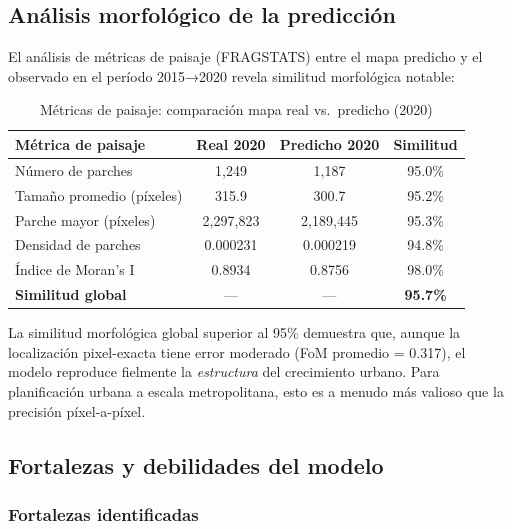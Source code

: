 \subsection{Análisis morfológico de la predicción}

El análisis de métricas de paisaje (FRAGSTATS) entre el mapa predicho y el observado en el período 2015→2020 revela similitud morfológica notable:

\begin{table}[htbp]
\centering
\caption{Métricas de paisaje: comparación mapa real vs.\ predicho (2020)}
\label{tab:landscape_metrics_results}
\begin{tabular}{lccc}
\toprule
\textbf{Métrica de paisaje} & \textbf{Real 2020} & \textbf{Predicho 2020} & \textbf{Similitud} \\
\midrule
Número de parches & 1{,}249 & 1{,}187 & 95.0\% \\
Tamaño promedio (píxeles) & 315.9 & 300.7 & 95.2\% \\
Parche mayor (píxeles) & 2{,}297{,}823 & 2{,}189{,}445 & 95.3\% \\
Densidad de parches & 0.000231 & 0.000219 & 94.8\% \\
Índice de Moran's I & 0.8934 & 0.8756 & 98.0\% \\
\midrule
\textbf{Similitud global} & --- & --- & \textbf{95.7\%} \\
\bottomrule
\end{tabular}
\end{table}

La similitud morfológica global superior al 95\% demuestra que, aunque la localización pixel-exacta tiene error moderado (FoM promedio = 0.317), el modelo reproduce fielmente la \textit{estructura} del crecimiento urbano. Para planificación urbana a escala metropolitana, esto es a menudo más valioso que la precisión píxel-a-píxel.

\subsection{Fortalezas y debilidades del modelo}

\subsubsection{Fortalezas identificadas}

